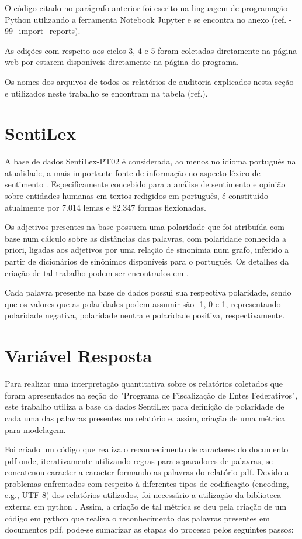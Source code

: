 O código citado no parágrafo anterior foi escrito na linguagem de programação Python utilizando a ferramenta Notebook Jupyter e se encontra no anexo (ref. - 99_import_reports).

As edições com respeito aos ciclos 3, 4 e 5 foram coletadas diretamente na página web por estarem disponíveis diretamente na página do programa.

Os nomes dos arquivos de todos os relatórios de auditoria explicados nesta seção e utilizados neste trabalho se encontram na tabela (ref.).

\section{SentiLex}
\label{sec:sentilex}

A base de dados SentiLex-PT02 é considerada, ao menos no idioma português na atualidade, a mais importante fonte de informação no aspecto léxico de sentimento \citep{BeckerTumitan2014}. Especificamente concebido para a análise de sentimento e opinião sobre entidades humanas em textos redigidos em português, é constituído atualmente por 7.014 lemas e 82.347 formas flexionadas.

Os adjetivos presentes na base possuem uma polaridade que foi atribuída com base num cálculo sobre as distâncias das palavras, com polaridade conhecida a priori, ligadas aos adjetivos por uma relação de sinonímia num grafo, inferido a partir de dicionários de sinônimos disponíveis para o português. Os detalhes da criação de tal trabalho podem ser encontrados em \citep{BeckerTumitan2014}.

Cada palavra presente na base de dados possui sua respectiva polaridade, sendo que os valores que as polaridades podem assumir são -1, 0 e 1, representando polaridade negativa, polaridade neutra e polaridade positiva, respectivamente.

\section{Variável Resposta}
\label{sec:variavel_resposta}

Para realizar uma interpretação quantitativa sobre os relatórios coletados que foram apresentados na seção do "Programa de Fiscalização de Entes Federativos", este trabalho utiliza a base da dados SentiLex para definição de polaridade de cada uma das palavras presentes no relatório e, assim, criação de uma métrica para modelagem.

Foi criado um código que realiza o reconhecimento de caracteres do documento pdf onde, iterativamente utilizando regras para separadores de palavras, se concatenou caracter a caracter formando as palavras do relatório pdf. Devido a problemas enfrentados com respeito à diferentes tipos de codificação (encoding, e.g., UTF-8) dos relatórios utilizados, foi necessário a utilização da biblioteca externa em python \cite{PDFMiner}. Assim, a criação de tal métrica se deu pela criação de um código em python que realiza o reconhecimento das palavras presentes em documentos pdf, pode-se sumarizar as etapas do processo pelos seguintes passos:

